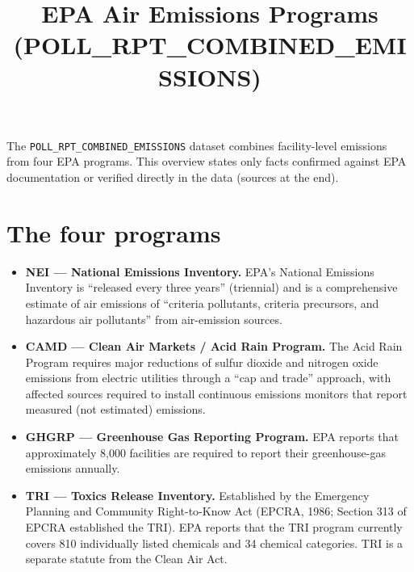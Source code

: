 \documentclass[11pt]{article}
\title{EPA Air Emissions Programs (POLL\_RPT\_COMBINED\_EMISSIONS)}
\author{}
\date{}
\begin{document}
\maketitle

\noindent The \texttt{POLL\_RPT\_COMBINED\_EMISSIONS} dataset combines facility-level emissions from four
EPA programs. This overview states only facts confirmed against EPA documentation or verified directly
in the data (sources at the end).

\section*{The four programs}
\begin{itemize}
  \item \textbf{NEI --- National Emissions Inventory.} EPA's National Emissions Inventory is ``released
  every three years'' (triennial) and is a comprehensive estimate of air emissions of ``criteria
  pollutants, criteria precursors, and hazardous air pollutants'' from air-emission sources.
  \item \textbf{CAMD --- Clean Air Markets / Acid Rain Program.} The Acid Rain Program requires major
  reductions of sulfur dioxide and nitrogen oxide emissions from electric utilities through a ``cap and
  trade'' approach, with affected sources required to install continuous emissions monitors that report
  measured (not estimated) emissions.
  \item \textbf{GHGRP --- Greenhouse Gas Reporting Program.} EPA reports that approximately 8,000
  facilities are required to report their greenhouse-gas emissions annually.
  \item \textbf{TRI --- Toxics Release Inventory.} Established by the Emergency Planning and Community
  Right-to-Know Act (EPCRA, 1986; Section 313 of EPCRA established the TRI). EPA reports that the TRI
  program currently covers 810 individually listed chemicals and 34 chemical categories. TRI is a
  separate statute from the Clean Air Act.
\end{itemize}
\end{document}

